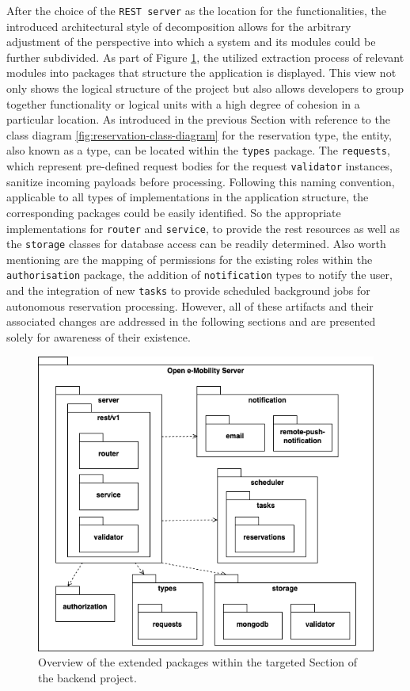 After the choice of the \texttt{REST server} as the location for the functionalities, the introduced architectural style of decomposition allows for the arbitrary adjustment of the perspective into which a system and its modules could be further subdivided.
As part of Figure \ref{fig:package-view}, the utilized extraction process of relevant modules into packages that structure the application is displayed. This view not only shows the logical structure of the project but also allows developers to group together functionality or logical units with a high degree of cohesion in a particular location.
As introduced in the previous Section with reference to the class diagram \ref{fig:reservation-class-diagram} for the reservation type, the entity, also known as a type, can be located within the \texttt{types} package. 
The \texttt{requests}, which represent pre-defined request bodies for the request \texttt{validator} instances, sanitize incoming payloads before processing. Following this naming convention, applicable to all types of implementations in the application structure, the corresponding packages could be easily identified.
So the appropriate implementations for \texttt{router} and \texttt{service}, to provide the \acrshort{rest} resources as well as the \texttt{storage} classes for database access can be readily determined. 
Also worth mentioning are the mapping of permissions for the existing roles within the \texttt{authorisation} package, the addition of \texttt{notification} types to notify the user, and the integration of new \texttt{tasks} to provide scheduled background jobs for autonomous reservation processing.
However, all of these artifacts and their associated changes are addressed in the following sections and are presented solely for awareness of their existence.

\begin{figure}[h]
    \centering
    \includegraphics[scale=0.4]{resources/images/main/6_implementation/PackageDiagram.png}
    \caption{Overview of the extended packages within the targeted Section of the backend project.}
    \label{fig:package-view}
\end{figure}

